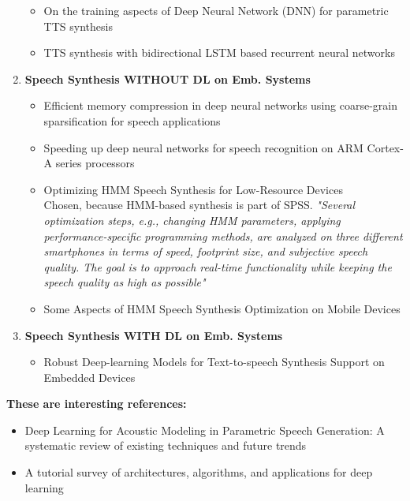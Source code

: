 \begin{enumerate}[leftmargin=16pt]
\begin{itemize}[leftmargin=10pt]
		\item \textcolor{black!40}{On the training aspects of Deep Neural Network (DNN) for parametric TTS synthesis \cite{qian:training}}
		\item \textcolor{black!40}{TTS synthesis with bidirectional LSTM based recurrent neural networks \cite{fan:tts}}
	\end{itemize}
	\vspace{1em}
	\item \textbf{Speech Synthesis WITHOUT DL on Emb. Systems}
	\begin{itemize}[leftmargin=10pt]
		\item \textcolor{black!40}{Efficient memory compression in deep neural networks using coarse-grain sparsification for speech applications \cite{kadetotad:efficient}}
		\item \textcolor{black!40}{Speeding up deep neural networks for speech recognition on ARM Cortex-A series processors \cite{xing:speeding}}
		\item \textcolor{ACMRed}{Optimizing HMM Speech Synthesis for Low-Resource Devices} \cite{toth:optimizing}\\
		Chosen, because \ac{HMM}-based synthesis is part of \ac{SPSS}. \textit{"Several optimization steps, e.g., changing HMM parameters, applying performance-specific programming methods, are analyzed on three different smartphones in terms of speed, footprint size, and	subjective speech quality. The goal is to approach real-time functionality while keeping the speech quality as high as possible"}
		\item \textcolor{black!40}{Some Aspects of HMM Speech Synthesis Optimization on Mobile Devices \cite{toth:aspects}}
	\end{itemize}
	\vspace{1em}
	\item \textbf{Speech Synthesis WITH DL on Emb. Systems}
	\begin{itemize}[leftmargin=10pt]
		\item \textcolor{ACMRed}{Robust Deep-learning Models for Text-to-speech Synthesis Support on Embedded Devices} \cite{boros:robust}
	\end{itemize}
\end{enumerate}

\vspace{1em}

\textbf{These are interesting references:}
\vspace{1em}
\begin{itemize}[leftmargin=10pt]
	\item Deep Learning for Acoustic Modeling in Parametric Speech Generation: A systematic review of existing techniques and future trends \cite{ling:deep}
	\item A tutorial survey of architectures, algorithms, and applications for deep learning \cite{li:survey}
\end{itemize}

\clearpage